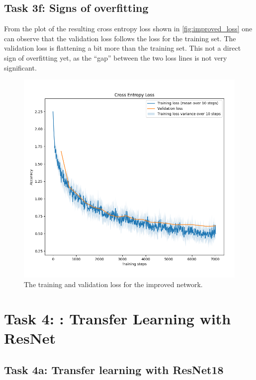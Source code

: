 \documentclass{article}
\begin{document}
\subsection{Task 3f: Signs of overfitting}

From the plot of the resulting cross entropy loss shown in \autoref{fig:improved_loss} one can observe that the validation loss follows the loss for the training set. The validation loss is flattening a bit more than the training set. This not a direct sign of overfitting yet, as the ``gap'' between the two loss lines is not very significant.  

\begin{figure}[H]
    \centering
    \includegraphics[width = \textwidth]{Assignments/Assignment_3/plots/painteroooo.png}
    \caption{The training and validation loss for the improved network.}
    \label{fig:improved_loss}
\end{figure}

\section{Task 4: : Transfer Learning with ResNet}

\subsection{Task 4a: Transfer learning with ResNet18}
\end{document}
